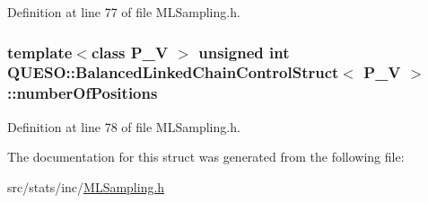 Definition at line 77 of file M\-L\-Sampling.\-h.

\hypertarget{struct_q_u_e_s_o_1_1_balanced_linked_chain_control_struct_aeee66de097885f91bcbeabc03d437b63}{
\subsubsection[{number\-Of\-Positions}]{\setlength{\rightskip}{0pt plus 5cm}template$<$class P\-\_\-\-V $>$ unsigned int {\bf Q\-U\-E\-S\-O\-::\-Balanced\-Linked\-Chain\-Control\-Struct}$<$ P\-\_\-\-V $>$\-::number\-Of\-Positions}}\label{struct_q_u_e_s_o_1_1_balanced_linked_chain_control_struct_aeee66de097885f91bcbeabc03d437b63}


Definition at line 78 of file M\-L\-Sampling.\-h.



The documentation for this struct was generated from the following file\-:\begin{DoxyCompactItemize}
\item 
src/stats/inc/\hyperlink{_m_l_sampling_8h}{M\-L\-Sampling.\-h}\end{DoxyCompactItemize}
